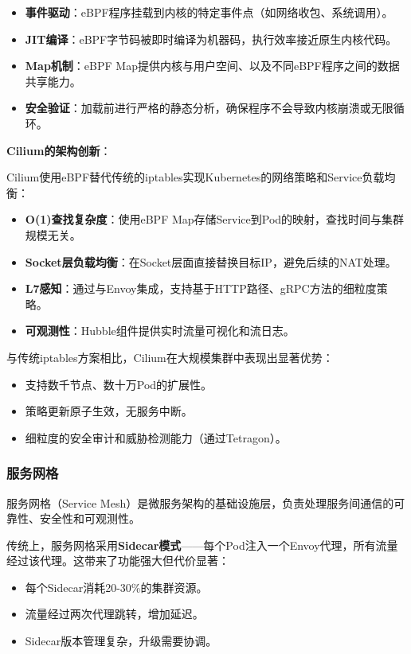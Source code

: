 \begin{itemize}
    \item \textbf{事件驱动}：eBPF程序挂载到内核的特定事件点（如网络收包、系统调用）。
    \item \textbf{JIT编译}：eBPF字节码被即时编译为机器码，执行效率接近原生内核代码。
    \item \textbf{Map机制}：eBPF Map提供内核与用户空间、以及不同eBPF程序之间的数据共享能力。
    \item \textbf{安全验证}：加载前进行严格的静态分析，确保程序不会导致内核崩溃或无限循环。
\end{itemize}

\textbf{Cilium的架构创新}：

Cilium使用eBPF替代传统的iptables实现Kubernetes的网络策略和Service负载均衡：

\begin{itemize}
    \item \textbf{O(1)查找复杂度}：使用eBPF Map存储Service到Pod的映射，查找时间与集群规模无关。
    \item \textbf{Socket层负载均衡}：在Socket层面直接替换目标IP，避免后续的NAT处理。
    \item \textbf{L7感知}：通过与Envoy集成，支持基于HTTP路径、gRPC方法的细粒度策略。
    \item \textbf{可观测性}：Hubble组件提供实时流量可视化和流日志。
\end{itemize}

与传统iptables方案相比，Cilium在大规模集群中表现出显著优势：
\begin{itemize}
    \item 支持数千节点、数十万Pod的扩展性。
    \item 策略更新原子生效，无服务中断。
    \item 细粒度的安全审计和威胁检测能力（通过Tetragon）。
\end{itemize}

\subsubsection{服务网格}

服务网格（Service Mesh）是微服务架构的基础设施层，负责处理服务间通信的可靠性、安全性和可观测性。

传统上，服务网格采用\textbf{Sidecar模式}——每个Pod注入一个Envoy代理，所有流量经过该代理。这带来了功能强大但代价显著：
\begin{itemize}
    \item 每个Sidecar消耗20-30\%的集群资源。
    \item 流量经过两次代理跳转，增加延迟。
    \item Sidecar版本管理复杂，升级需要协调。
\end{itemize}

